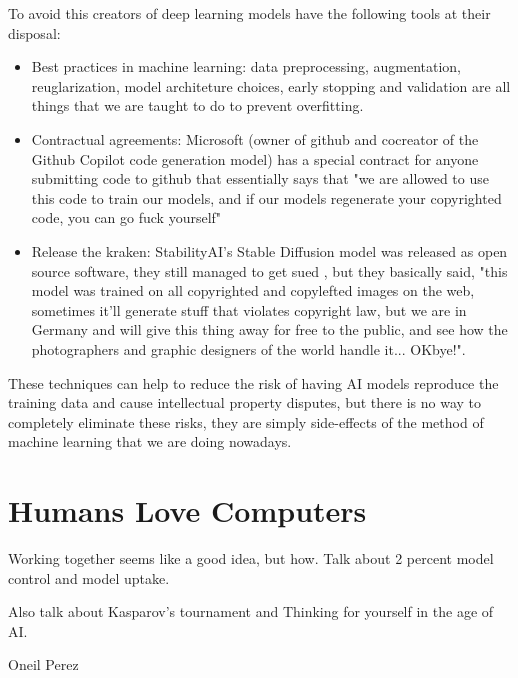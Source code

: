 To avoid this creators of deep learning models have the following tools at their disposal:

\begin{itemize}
\item Best practices in  machine learning: data preprocessing, augmentation, reuglarization, model architeture choices, early stopping and validation are all things that we are taught to do to prevent overfitting.
\item Contractual agreements: Microsoft (owner of github and cocreator of the Github Copilot code generation model) has a special contract for anyone submitting code to github that essentially says that "we are allowed to use this code to train our models, and if our models regenerate your copyrighted code, you can go fuck yourself" 
\item Release the kraken: StabilityAI's Stable Diffusion model was released as open source software, they still managed to get sued , but they basically said, "this model was trained on all copyrighted and copylefted images on the web, sometimes it'll generate stuff that violates copyright law, but we are in Germany and will give this thing away for free to the public, and see how the photographers and graphic designers of the world handle it... OKbye!". 
\end{itemize}

These techniques can help to reduce the risk of having AI models reproduce the training data and cause intellectual property disputes, but there is no way to completely eliminate these risks, they are simply side-effects of the method of machine learning that we are doing nowadays.

\section{Humans Love Computers}

Working together seems like a good idea, but how. Talk about 2 percent model control and model uptake. 

Also talk about Kasparov's tournament and Thinking for yourself in the age of AI. 

Oneil\cite{Oneil2017}
Perez\cite{Perez2019}

